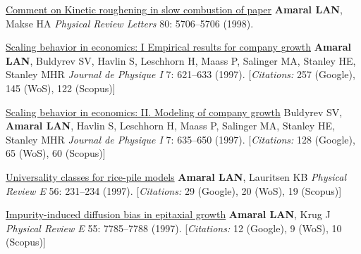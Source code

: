 \NumberedItem{\makebox[0.8cm][r]{[15]}}
\href{/people/amaral/comment-on-kinetic-roughening-in-slow-combustion-of-paper}
{Comment on Kinetic roughening in slow combustion of paper}
\newline
{\textbf{Amaral LAN}}, Makse HA
\newline
\textit{Physical Review Letters}
    80:
5706--5706 (1998).
\newline
\Gap
~
\Gap

\NumberedItem{\makebox[0.8cm][r]{[14]}}
\href{/people/amaral/scaling-behavior-in-economics-1-empirical-results-for-company-growth}
{Scaling behavior in economics: I Empirical results for company growth}
\newline
{\textbf{Amaral LAN}}, Buldyrev SV, Havlin S, Leschhorn H, Maass P, Salinger MA, Stanley HE, Stanley MHR
\newline
\textit{Journal de Physique I}
    7:
621--633 (1997).
    [{\em{Citations:}} 257 (Google), 145 (WoS), 122 (Scopus)]
\newline
\Gap
~
\Gap

\NumberedItem{\makebox[0.8cm][r]{[13]}}
\href{/people/amaral/scaling-behavior-in-economics-2-modeling-of-company-growth}
{Scaling behavior in economics: II. Modeling of company growth}
\newline
Buldyrev SV, {\textbf{Amaral LAN}}, Havlin S, Leschhorn H, Maass P, Salinger MA, Stanley HE, Stanley MHR
\newline
\textit{Journal de Physique I}
    7:
635--650 (1997).
    [{\em{Citations:}} 128 (Google), 65 (WoS), 60 (Scopus)]
\newline
\Gap
~
\Gap

\NumberedItem{\makebox[0.8cm][r]{[12]}}
\href{/people/amaral/universality-classes-for-rice-pile-models}
{Universality classes for rice-pile models}
\newline
{\textbf{Amaral LAN}}, Lauritsen KB
\newline
\textit{Physical Review E}
    56:
231--234 (1997).
    [{\em{Citations:}} 29 (Google), 20 (WoS), 19 (Scopus)]
\newline
\Gap
~
\Gap

\NumberedItem{\makebox[0.8cm][r]{[11]}}
\href{/people/amaral/impurity-induced-diffusion-bias-in-epitaxial-growth}
{Impurity-induced diffusion bias in epitaxial growth}
\newline
{\textbf{Amaral LAN}}, Krug J
\newline
\textit{Physical Review E}
    55:
7785--7788 (1997).
    [{\em{Citations:}} 12 (Google), 9 (WoS), 10 (Scopus)]
\newline
\Gap
~
\Gap

